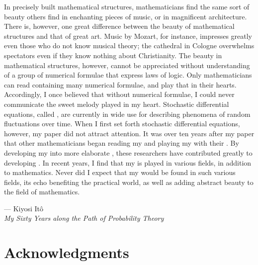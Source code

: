 \documentclass[singlespacing]{lsuthesis}
\numberwithin{equation}{section}
\theoremstyle{plain}
\theoremstyle{definition}
\theoremstyle{remark}
\begin{document}
\setlength{\epigraphwidth}{0.67\textwidth}
\begin{centeredpage}
    \epigraph{In precisely built mathematical structures, mathematicians find the same sort of beauty others find in enchanting pieces of music, or in magnificent architecture. There is, however, one great difference between the beauty of mathematical structures and that of great art. Music by Mozart, for instance, impresses greatly even those who do not know musical theory; the cathedral in Cologne overwhelms spectators even if they know nothing about Christianity. The beauty in mathematical structures, however, cannot be appreciated without understanding of a group of numerical formulae that express laws of logic. Only mathematicians can read  containing many numerical formulae, and play that  in their hearts. Accordingly, I once believed that without numerical formulae, I could never communicate the sweet melody played in my heart. Stochastic differential equations, called , are currently in wide use for describing phenomena of random fluctuations over time. When I first set forth stochastic differential equations, however, my paper did not attract attention. It was over ten years after my paper that other mathematicians began reading my  and playing my  with their . By developing my  into more elaborate , these researchers have contributed greatly to developing . In recent years, I find that my  is played in various fields, in addition to mathematics. Never did I expect that my  would be found in such various fields, its echo benefiting the practical world, as well as adding abstract beauty to the field of mathematics.}{— Kiyosi Itô \hspace*{16.75em} \\
    \textit{My Sixty Years along the Path of Probability Theory}}
\end{centeredpage}
    

\chapter{Acknowledgments}


\begingroup
\hypersetup{linkcolor=black}
\tableofcontents
\endgroup
\end{document}
